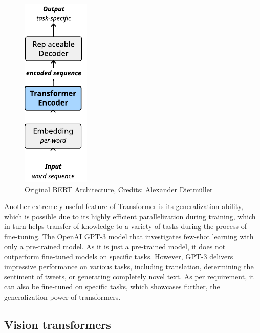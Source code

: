 \begin{figure}[!hbt]
  \begin{center}
    \includegraphics[scale=1.5]{figures/architecture_bert.pdf}
    \caption{Original BERT Architecture, Credits: Alexander Dietmüller}
    \label{fig:bert}
  \end{center}
\end{figure}



Another extremely useful feature of Transformer is its generalization ability, which is  possible due to its highly efficient parallelization during training, which in turn helps transfer of knowledge to a variety of tasks during the process of fine-tuning. The OpenAI GPT-3\cite{brownLanguageModelsAre2020} model that investigates few-shot learning with only a pre-trained model.
As it is just a pre-trained model, it does not outperform fine-tuned models on specific tasks. However, GPT-3 delivers impressive performance on various tasks, including translation, determining the sentiment of tweets, or generating completely novel text. As per requirement, it can also be fine-tuned on specific tasks, which showcases further, the generalization power of transformers.


\subsection{Vision transformers}
\label{ssec:bgvit}

